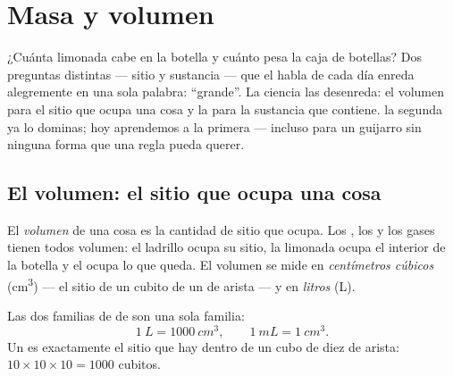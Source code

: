 \chapter{Masa y volumen}\label{ch:g6:mass-and-volume}

¿Cuánta limonada cabe en la botella y cuánto pesa la caja de botellas?
Dos preguntas distintas --- sitio y sustancia --- que el habla de cada
día enreda alegremente en una sola palabra: ``grande''. La ciencia las
desenreda: el volumen para el sitio que ocupa una cosa y la
 para la sustancia que contiene.  la segunda ya lo dominas;
hoy aprendemos a  la primera --- incluso para un guijarro sin
ninguna forma que una regla pueda querer.

\section{El volumen: el sitio que ocupa una cosa}

\begin{definition}[El volumen]\label{def:g6:mass-and-volume:volume}
El \emph{volumen} de una cosa es la cantidad de sitio
que ocupa. Los , los  y los gases tienen todos
volumen: el ladrillo ocupa su sitio, la limonada ocupa el interior de
la botella y el  ocupa lo que queda. El volumen se mide en
\emph{centímetros cúbicos} (\unit{cm^3}) ---
el sitio de un cubito de un  de arista --- y en
\emph{litros} (\unit{L}).
\end{definition}

\begin{proposition}\label{prop:g6:mass-and-volume:litre}
Las dos familias de  de  son una sola familia:
\[
\qty{1}{L} = \qty{1000}{cm^3},
\qquad
\qty{1}{mL} = \qty{1}{cm^3}.
\]
Un  es exactamente el sitio que hay dentro de un cubo de diez
 de arista: $10 \times 10 \times 10 = 1000$ cubitos.
\end{proposition}

